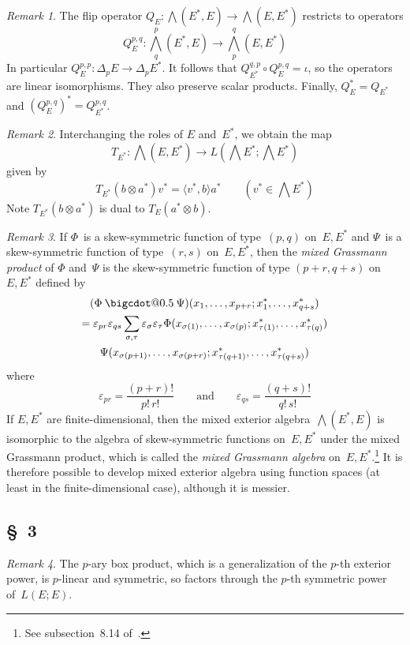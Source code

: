 \documentclass[letterpaper,12pt]{article}
\makeatletter
\newcommand{\bigcdot}[1]{\mathbin{\mathpalette\bigcdot@{#1}}}
\newcommand{\bigcdot@}[2]{%
  \sbox0{$#1\vcenter{}$}%
  \sbox2{$#1\cdot\m@th$}%
  \hbox{%
    \hfil
    \raise\ht0\hbox{%
      \scalebox{#2}{%
        \lower\ht0\hbox{$#1\bullet\m@th$}%
      }%
    }%
    \hfil
  }%
}
\newcommand{\after}{\circ}
\newcommand{\tprod}{\otimes}
\newcommand{\bigeprod}{\bigwedge}
\newcommand{\medeprod}{{\textstyle\bigeprod}}
\newcommand{\mprod}{\bigcdot{0.5}}
\newcommand{\sprod}[2]{\langle#1,#2\rangle}
\newcommand{\sign}[1]{\varepsilon_{#1}}
\theoremstyle{definition}
\theoremstyle{remark}
\newtheorem*{rmk}{Remark}
\makeatother
\begin{document}
\begin{rmk}
The flip operator \(Q_E:\medeprod(E^*,E)\to\medeprod(E,E^*)\) restricts to operators
\[Q_E^{p,q}:\medeprod^p_q(E^*,E)\to\medeprod^q_p(E,E^*)\]
In particular \(Q_E^{p,p}:\Delta_p E\to\Delta_p E^*\). It follows that \(Q_{E^*}^{q,p}\after Q_E^{p,q}=\iota\), so the operators are linear isomorphisms. They also preserve scalar products. Finally, \(Q_E^*=Q_{E^*}\) and \((Q_E^{p,q})^*=Q_{E^*}^{p,q}\).
\end{rmk}

\begin{rmk}
Interchanging the roles of \(E\) and~\(E^*\), we obtain the map
\[T_{E^*}:\medeprod(E,E^*)\to L(\medeprod E^*;\medeprod E^*)\]
given by
\[T_{E^*}(b\tprod a^*)v^*=\sprod{v^*}{b}a^*\qquad(v^*\in\medeprod E^*)\]
Note \(T_{E^*}(b\tprod a^*)\) is dual to \(T_E(a^*\tprod b)\).
\end{rmk}

\begin{rmk}
If \(\Phi\)~is a skew-symmetric function of type~\((p,q)\) on~\(E,E^*\) and \(\Psi\)~is a skew-symmetric function of type~\((r,s)\) on~\(E,E^*\), then the \emph{mixed Grassmann product} of \(\Phi\) and~\(\Psi\) is the skew-symmetric function of type \((p+r,q+s)\) on~\(E,E^*\) defined by
\begin{multline*}
(\Phi\mprod\Psi)(x_1,\ldots,x_{p+r};x^*_1,\ldots,x^*_{q+s})\\
	=\varepsilon_{pr}\varepsilon_{qs}\sum_{\sigma,\tau}\sign{\sigma}\sign{\tau}\Phi(x_{\sigma(1)},\ldots,x_{\sigma(p)};x^*_{\tau(1)},\ldots,x^*_{\tau(q)})\\
		\Psi(x_{\sigma(p+1)},\ldots,x_{\sigma(p+r)};x^*_{\tau(q+1)},\ldots,x^*_{\tau(q+s)})
\end{multline*}
where
\[\varepsilon_{pr}=\frac{(p+r)!}{p!\,r!}\qquad\text{and}\qquad\varepsilon_{qs}=\frac{(q+s)!}{q!\,s!}\]
If \(E,E^*\) are finite-dimensional, then the mixed exterior algebra~\(\medeprod(E^*,E)\) is isomorphic to the algebra of skew-symmetric functions on~\(E,E^*\) under the mixed Grassmann product, which is called the \emph{mixed Grassmann algebra} on~\(E,E^*\).\footnote{See subsection~8.14 of~\cite{greub3}.} It is therefore possible to develop mixed exterior algebra using function spaces (at least in the finite-dimensional case), although it is messier.
\end{rmk}

\subsection*{\S~3}
\begin{rmk}
The \(p\)-ary box product, which is a generalization of the \(p\)-th exterior power, is \(p\)-linear and symmetric, so factors through the \(p\)-th symmetric power of~\(L(E;E)\).
\end{rmk}
\end{document}
